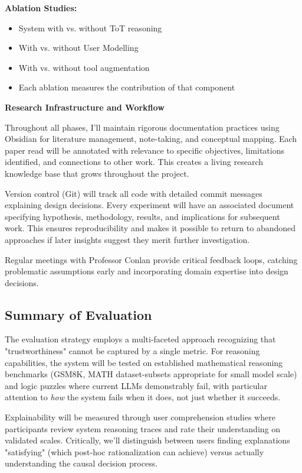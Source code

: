 \documentclass[a4paper,oneside,12pt]{book}
\numberwithin{equation}{chapter} %
\begin{document}
\textbf{Ablation Studies:}
\begin{itemize}
\item System with vs. without ToT reasoning
\item With vs. without User Modelling
\item With vs. without tool augmentation
\item Each ablation measures the contribution of that component
\end{itemize}

\textbf{Research Infrastructure and Workflow}

Throughout all phases, I'll maintain rigorous documentation practices using Obsidian for literature management, note-taking, and conceptual mapping. Each paper read will be annotated with relevance to specific objectives, limitations identified, and connections to other work. This creates a living research knowledge base that grows throughout the project.

Version control (Git) will track all code with detailed commit messages explaining design decisions. Every experiment will have an associated document specifying hypothesis, methodology, results, and implications for subsequent work. This ensures reproducibility and makes it possible to return to abandoned approaches if later insights suggest they merit further investigation.

Regular meetings with Professor Conlan provide critical feedback loops, catching problematic assumptions early and incorporating domain expertise into design decisions.

\subsection{Summary of Evaluation}

The evaluation strategy employs a multi-faceted approach recognizing that "trustworthiness" cannot be captured by a single metric. For reasoning capabilities, the system will be tested on established mathematical reasoning benchmarks (GSM8K, MATH dataset-subsets appropriate for small model scale) and logic puzzles where current LLMs demonstrably fail, with particular attention to \textit{how} the system fails when it does, not just whether it succeeds.

Explainability will be measured through user comprehension studies where participants review system reasoning traces and rate their understanding on validated scales. Critically, we'll distinguish between users finding explanations "satisfying" (which post-hoc rationalization can achieve) versus actually understanding the causal decision process.
\end{document}
